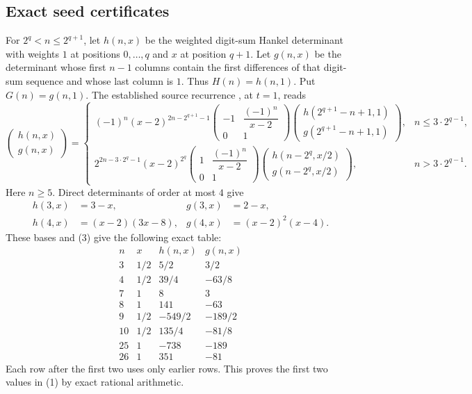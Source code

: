 \documentclass[11pt]{article}
\begin{document}
\subsection*{Exact seed certificates}
For $2^q<n\le2^{q+1}$, let $h(n,x)$ be the weighted digit-sum
Hankel determinant with weights $1$ at positions $0,\ldots,q$ and
$x$ at position $q+1$. Let $g(n,x)$ be the determinant whose first
$n-1$ columns contain the first differences of that digit-sum
sequence and whose last column is $1$. Thus $H(n)=h(n,1)$.
Put $G(n)=g(n,1)$.
The established source recurrence \cite[Proposition 4.3]{SU}, at $t=1$,
reads
\[
 \begin{pmatrix}h(n,x)\\g(n,x)\end{pmatrix}
 =\begin{cases}
 (-1)^n(x-2)^{2n-2^{q+1}-1}
 \begin{pmatrix}-1&\dfrac{(-1)^n}{x-2}\\0&1\end{pmatrix}
 \begin{pmatrix}h(2^{q+1}-n+1,1)\\g(2^{q+1}-n+1,1)\end{pmatrix},
 &n\le3\cdot2^{q-1},\\[6pt]
 2^{2n-3\cdot2^q-1}(x-2)^{2^q}
 \begin{pmatrix}1&\dfrac{(-1)^n}{x-2}\\0&1\end{pmatrix}
 \begin{pmatrix}h(n-2^q,x/2)\\g(n-2^q,x/2)\end{pmatrix},
 &n>3\cdot2^{q-1}.
 \end{cases}                                                  \tag{3}
\]
Here $n\ge5$. Direct determinants of order at most $4$ give
\[
 \begin{aligned}
 h(3,x)&=3-x,&g(3,x)&=2-x,\\
 h(4,x)&=(x-2)(3x-8),&g(4,x)&=(x-2)^2(x-4).
 \end{aligned}
\]
These bases and (3) give the following exact table:
\[
 \begin{array}{c|c|r|r}
 n&x&h(n,x)&g(n,x)\\\hline
 3&1/2&5/2&3/2\\
 4&1/2&39/4&-63/8\\
 7&1&8&3\\
 8&1&141&-63\\
 9&1/2&-549/2&-189/2\\
 10&1/2&135/4&-81/8\\
 25&1&-738&-189\\
 26&1&351&-81
 \end{array}                                                  \tag{4}
\]
Each row after the first two uses only earlier rows. This proves
the first two values in (1) by exact rational arithmetic.
\end{document}
